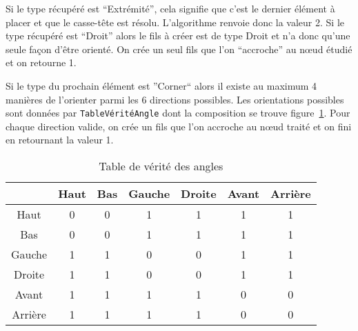 Si le type récupéré est ``Extrémité'', cela signifie que c'est le dernier élément à placer et que le casse-tête est résolu. L'algorithme renvoie donc la valeur 2. Si le type récupéré est ``Droit'' alors le fils à créer est de type Droit et n'a donc qu'une seule façon d'être orienté. On crée un seul fils que l'on ``accroche'' au nœud étudié et on retourne 1.

Si le type du prochain élément est ''Corner`` alors il existe au maximum 4 manières de l'orienter parmi les 6 directions possibles. Les orientations possibles sont données par \verb|TableVéritéAngle| dont la composition se trouve figure~\ref{truthTable}. Pour chaque direction valide, on crée un fils que l'on accroche au nœud traité et on fini en retournant la valeur 1.

\begin{table}
\begin{center}
\begin{tabular}{|*{7}{c|}}
\hline
~ & Haut & Bas & Gauche & Droite & Avant & Arrière \\
\hline
Haut & 0 & 0 & 1 & 1 & 1 & 1 \\
\hline
Bas & 0 & 0 & 1 & 1 & 1 & 1 \\
\hline
Gauche & 1 & 1 & 0 & 0 & 1 & 1 \\
\hline
Droite & 1 & 1 & 0 & 0 & 1 & 1 \\
\hline
Avant & 1 & 1 & 1 & 1 & 0 & 0 \\
\hline
Arrière & 1 & 1 & 1 & 1 & 0 & 0 \\
\hline
\end{tabular}
\end{center}
\caption{Table de vérité des angles}
\label{truthTable}
\end{table}
